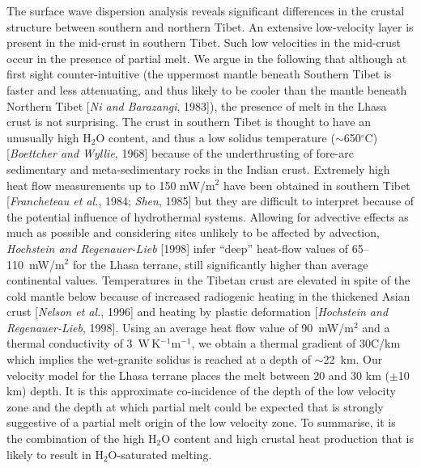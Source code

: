 \documentclass[12pt]{article}
\begin{document}
The surface wave dispersion analysis reveals significant differences in the crustal structure between 
southern and northern Tibet.   
An extensive low-velocity layer is present in the mid-crust in southern Tibet.  
Such low velocities in the mid-crust occur in the presence of partial
melt.   We argue in the following that
although at first sight
counter-intuitive (the uppermost mantle beneath Southern Tibet is
faster and less attenuating, and thus likely to be cooler than the
mantle beneath Northern Tibet [{\it Ni and Barazangi}, 1983]), the
presence of melt in the Lhasa crust is not surprising.  
 The crust in southern Tibet is thought to have an unusually 
high H$_2$O content, and thus a low solidus temperature ($\sim$650$^\circ$C) [{\it Boettcher and Wyllie}, 
1968] because of the 
underthrusting of fore-arc sedimentary and meta-sedimentary rocks in the Indian crust.
Extremely high heat flow measurements up to 150 mW/m$^2$ have been
obtained in southern Tibet [{\it Francheteau et al.}, 1984; {\it
Shen}, 1985] but they are difficult to interpret
because of the potential influence of hydrothermal systems.  Allowing
for advective effects as much as possible and considering sites
unlikely to be affected by advection, {\it Hochstein and
Regenauer-Lieb} [1998] infer ``deep'' heat-flow values of
65--110~mW/m$^2$ for the Lhasa terrane, still significantly higher than average 
continental values. Temperatures in the Tibetan crust are elevated in spite of the cold
mantle below because of 
increased radiogenic heating in the thickened Asian crust [{\it Nelson
et al.}, 1996] and heating by plastic deformation [{\it Hochstein 
and Regenauer-Lieb}, 1998].  Using an average heat flow value of
90~mW/m$^2$ and a thermal conductivity of 3~W\,K$^{-1}$m$^{-1}$, we
obtain a thermal gradient of 30\dg C/km which implies the wet-granite
solidus is reached at a depth of $\sim$22~km.  
 Our 
velocity model for the Lhasa terrane places the melt between 20 and 30
km ($\pm$10 km) depth.  It is this approximate co-incidence of
the depth of the low velocity zone and the depth at which partial melt
could be expected that is strongly suggestive of a partial melt origin
of the low velocity zone. 
To summarise, it is the combination of the high H$_2$O content and
high crustal heat production that is likely to result 
in H$_2$O-saturated melting.
\end{document}
